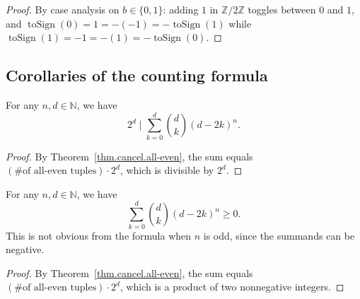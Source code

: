 \begin{proof}
\leanok
By case analysis on $b \in \{0, 1\}$: adding $1$ in $\mathbb{Z}/2\mathbb{Z}$ toggles between $0$ and $1$, and $\operatorname{toSign}(0) = 1 = -(-1) = -\operatorname{toSign}(1)$ while $\operatorname{toSign}(1) = -1 = -(1) = -\operatorname{toSign}(0)$.
\end{proof}

\subsection{Corollaries of the counting formula}

\begin{corollary}[Divisibility by $2^d$]
\label{cor.cancel.sum-choose-pow-dvd}
\leanhelper
\leanok
For any $n, d \in \mathbb{N}$, we have
\[
2^d \mid \sum_{k=0}^{d} \binom{d}{k} (d - 2k)^n.
\]
\end{corollary}

\begin{proof}
\leanok
By Theorem~\ref{thm.cancel.all-even}, the sum equals
$(\text{\# of all-even tuples}) \cdot 2^d$, which is divisible by $2^d$.
\end{proof}

\begin{corollary}[Nonnegativity]
\label{cor.cancel.sum-choose-pow-nonneg}
\leanhelper
\leanok
For any $n, d \in \mathbb{N}$, we have
\[
\sum_{k=0}^{d} \binom{d}{k} (d - 2k)^n \geq 0.
\]
This is not obvious from the formula when $n$ is odd, since the summands
can be negative.
\end{corollary}

\begin{proof}
\leanok
By Theorem~\ref{thm.cancel.all-even}, the sum equals
$(\text{\# of all-even tuples}) \cdot 2^d$, which is a product of two nonnegative
integers.
\end{proof}
